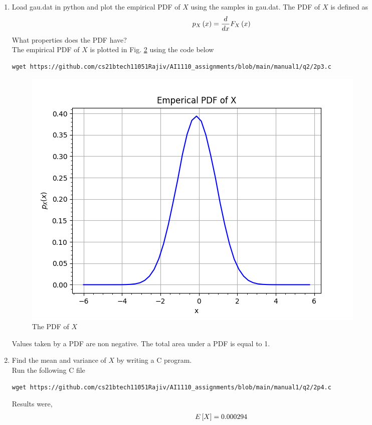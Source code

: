 \documentclass[journal,12pt,twocolumn]{IEEEtran}
\renewcommand\thesection{\arabic{section}}
\begin{document}
\begin{enumerate}[label=\thesection.\arabic*
,ref=\thesection.\theenumi]
\begin{figure}
\label{fig:gauss_cdf}
\end{figure}
A CDF is a non-decreasing function. 
Its value varies from 0 to 1.
It is continuous if PDF has finite values.
%
\item
Load gau.dat in python and plot the empirical PDF of $X$ using the samples in gau.dat. The PDF of $X$ is defined as
\begin{align}
p_{X}\left(x\right) = \frac{d}{dx}F_{X}\left(x\right)
\label{eq:pdf_cdf}
\end{align}
What properties does the PDF have?
\\
\solution The empirical PDF of $X$ is plotted in Fig. \ref{fig:gauss_pdf} using the code below
\begin{lstlisting}
wget https://github.com/cs21btech11051Rajiv/AI1110_assignments/blob/main/manual1/q2/2p3.c
\end{lstlisting}
\begin{figure}
\centering
\includegraphics[width=\columnwidth]{./figs/fig2.3.png}
\caption{The PDF of $X$}
\label{fig:gauss_pdf}
\end{figure}
Values taken by a PDF are non negative. The total area under a PDF is equal to 1. 
%
\item Find the mean and variance of $X$ by writing a C program.
\\
\solution Run the following C file
\begin{lstlisting}
wget https://github.com/cs21btech11051Rajiv/AI1110_assignments/blob/main/manual1/q2/2p4.c
\end{lstlisting}
Results were, 
\begin{align}
E\sbrak{X}  = 0.000294 \\

\end{align}
\end{enumerate}
\end{document}
